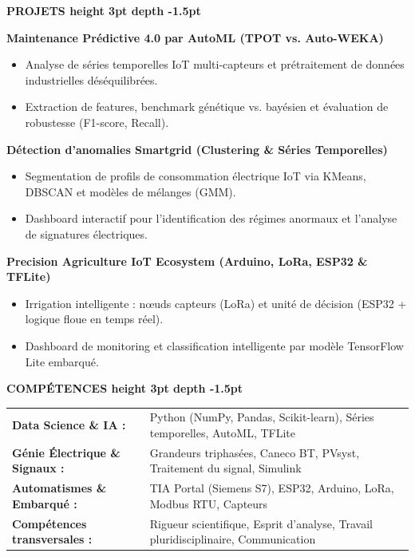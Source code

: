 \documentclass[10pt,a4paper]{altacv}
\renewcommand{\cvsection}[2][]{%
  \vspace{4pt}%
  {\color{heading}\Large\bfseries #2 \hspace{0.2em}\leaders\vrule height 3pt depth -1.5pt\hfill\mbox{}}\par\vspace{3pt}
}
\begin{document}
\cvsection{PROJETS}
{\normalsize\bfseries\color{accent} Maintenance Prédictive 4.0 par AutoML (TPOT vs. Auto-WEKA)}\par\vspace{1.5pt}
\begin{itemize}[leftmargin=*, label=\textbullet, nosep, itemsep=1.5pt]
  \item Analyse de séries temporelles IoT multi-capteurs et prétraitement de données industrielles déséquilibrées.
  \item Extraction de features, benchmark génétique vs. bayésien et évaluation de robustesse (F1-score, Recall).
\end{itemize}
\vspace{2pt}
{\normalsize\bfseries\color{accent} Détection d’anomalies Smartgrid (Clustering \& Séries Temporelles)}\par\vspace{1.5pt}
\begin{itemize}[leftmargin=*, label=\textbullet, nosep, itemsep=1.5pt]
  \item Segmentation de profils de consommation électrique IoT via KMeans, DBSCAN et modèles de mélanges (GMM).
  \item Dashboard interactif pour l'identification des régimes anormaux et l'analyse de signatures électriques.
\end{itemize}
\vspace{2pt}
{\normalsize\bfseries\color{accent} Precision Agriculture IoT Ecosystem (Arduino, LoRa, ESP32 \& TFLite)}\par\vspace{1.5pt}
\begin{itemize}[leftmargin=*, label=\textbullet, nosep, itemsep=1.5pt]
  \item Irrigation intelligente : nœuds capteurs (LoRa) et unité de décision (ESP32 + logique floue en temps réel).
  \item Dashboard de monitoring et classification intelligente par modèle TensorFlow Lite embarqué.
\end{itemize}

\cvsection{COMPÉTENCES}
\begin{tabular}{@{}ll@{}}
\textbf{Data Science \& IA :} & Python (NumPy, Pandas, Scikit-learn), Séries temporelles, AutoML, TFLite \\[1.5pt]
\textbf{Génie Électrique \& Signaux :} & Grandeurs triphasées, Caneco BT, PVsyst, Traitement du signal, Simulink \\[1.5pt]
\textbf{Automatismes \& Embarqué :} & TIA Portal (Siemens S7), ESP32, Arduino, LoRa, Modbus RTU, Capteurs \\[1.5pt]
\textbf{Compétences transversales :} & Rigueur scientifique, Esprit d'analyse, Travail pluridisciplinaire, Communication
\end{tabular}
\end{document}
